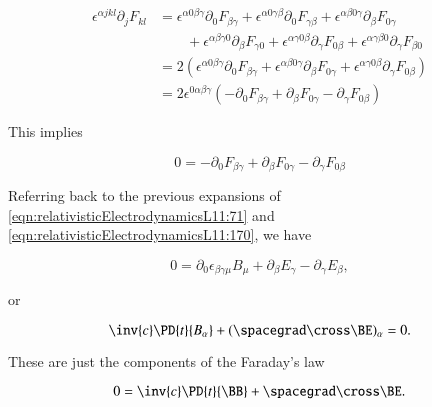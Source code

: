 \begin{align*}
\epsilon^{\alpha j k l} \partial_j F_{k l}
&=
\epsilon^{\alpha 0 \beta \gamma} \partial_0 F_{\beta \gamma}
+\epsilon^{\alpha 0 \gamma \beta} \partial_0 F_{\gamma \beta}
+\epsilon^{\alpha \beta 0 \gamma} \partial_\beta F_{0 \gamma} \\
&\qquad +\epsilon^{\alpha \beta \gamma 0} \partial_\beta F_{\gamma 0}
+\epsilon^{\alpha \gamma 0 \beta} \partial_\gamma F_{0 \beta}
+\epsilon^{\alpha \gamma \beta 0} \partial_\gamma F_{\beta 0} \\
&=
2 \left( 
\epsilon^{\alpha 0 \beta \gamma} \partial_0 F_{\beta \gamma}
+\epsilon^{\alpha \beta 0 \gamma} \partial_\beta F_{0 \gamma}
+\epsilon^{\alpha \gamma 0 \beta} \partial_\gamma F_{0 \beta}
\right) \\
&=
2 \epsilon^{0 \alpha \beta \gamma} \left(
-\partial_0 F_{\beta \gamma}
+\partial_\beta F_{0 \gamma}
- \partial_\gamma F_{0 \beta}
\right)
\end{align*}

This implies

\begin{equation}\label{eqn:relativisticElectrodynamicsL11:1320}
0 =
-\partial_0 F_{\beta \gamma}
+\partial_\beta F_{0 \gamma}
- \partial_\gamma F_{0 \beta}
\end{equation}

Referring back to the previous expansions of \ref{eqn:relativisticElectrodynamicsL11:71} and \ref{eqn:relativisticElectrodynamicsL11:170}, we have

\begin{equation}\label{eqn:relativisticElectrodynamicsL11:1340}
0 =
\partial_0 \epsilon_{\beta\gamma\mu} B_\mu
+\partial_\beta E_\gamma
- \partial_\gamma E_{\beta},
\end{equation}

or

\begin{equation}\label{eqn:relativisticElectrodynamicsL11:1360}
\inv{c} \PD{t}{B_\alpha} + (\spacegrad \cross \BE)_\alpha = 0.
\end{equation}

These are just the components of the Faraday's law

\begin{equation}\label{eqn:relativisticElectrodynamicsL11:930}
0 = \inv{c} \PD{t}{\BB} + \spacegrad \cross \BE.
\end{equation}

